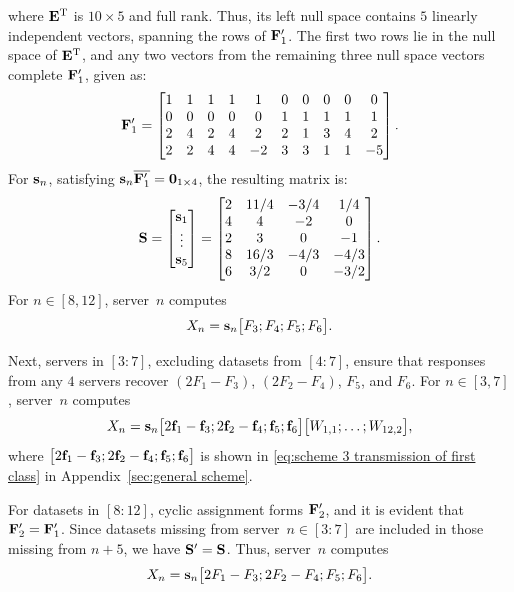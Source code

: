 \documentclass[conference,letterpaper]{IEEEtran}
\begin{document}
\begin{example}
where ${\bf E}^{\text{\rm T}}$ is \(10 \times 5\) and full rank. Thus, its left null space contains \(5\) linearly independent vectors, spanning the rows of ${\bf F}'_1$. The first two rows lie in the null space of ${\bf E}^{\text{\rm T}}$, and any two vectors from the remaining three null space vectors complete ${\bf F}'_1$, given as:
\[
{\bf F}'_1 = 
\begin{bmatrix}
1 & 1 & 1 & 1 & 1 & 0 & 0 & 0 & 0 & 0 \\
0 & 0 & 0 & 0 & 0 & 1 & 1 & 1 & 1 & 1 \\
2 & 4 & 2 & 4 & 2 & 2 & 1 & 3 & 4 & 2 \\
2 & 2 & 4 & 4 & -2 & 3 & 3 & 1 & 1 & -5
\end{bmatrix}.
\]
For \({\bf s}_n\), satisfying \({\bf s}_n \overline{{\bf F}'_1} = \mathbf{0}_{1 \times 4}\), the resulting matrix is:
\[
{\bf S} = 
\begin{bmatrix}
{\bf s}_{1} \\
\vdots \\
{\bf s}_{5}
\end{bmatrix} =  
\begin{bmatrix}
 2 & 11/4 & -3/4 & 1/4 \\
 4 & 4 & -2 & 0 \\
 2 & 3 & 0 & -1 \\
 8 & 16/3 & -4/3 & -4/3 \\
 6 & 3/2 & 0 & -3/2 \\
\end{bmatrix}.
\]
For \(n \in [8, 12]\), server~\(n\) computes 
\[
X_n = {\bf s}_n \bigl[F_3; F_4; F_5; F_6\bigr].
\]

Next, servers in \([3{:}7]\), excluding datasets from \([4{:}7]\), ensure that responses from any \(4\) servers recover \((2F_1 - F_3)\), \((2F_2 - F_4)\), \(F_5\), and \(F_6\). For \(n \in [3, 7]\), server~\(n\) computes
\[
X_n = {\bf s}_n \bigl[2{{\bf f}}_1 - {{\bf f}}_3; 2{{\bf f}}_2 - {{\bf f}}_4; {{\bf f}}_5; {{\bf f}}_6\bigr]\bigl[W_{1,1}; \ldots; W_{12,2}\bigr],
\]
where \(\bigl[2{{\bf f}}_1 - {{\bf f}}_3; 2{{\bf f}}_2 - {{\bf f}}_4; {{\bf f}}_5; {{\bf f}}_6\bigr]\) is shown in \eqref{eq:scheme 3 transmission of first class} in Appendix~\ref{sec:general scheme}.

For datasets in \([8{:}12]\), cyclic assignment forms \({\bf F}'_2\), and it is evident that \({\bf F}'_2 = {\bf F}'_1\). Since datasets missing from server~\(n \in [3{:}7]\) are included in those missing from \(n+5\), we have \({\bf S}' = {\bf S}\). Thus, server~\(n\) computes
\[
X_n = {\bf s}_n \bigl[2F_1 - F_3; 2F_2 - F_4; F_5; F_6\bigr].
\]
 


\end{example}
\end{document}
